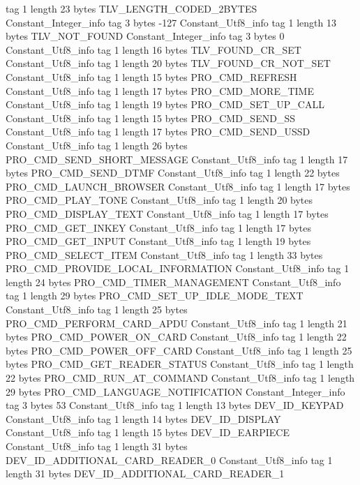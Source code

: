 {{{			tag	1
			length	23
			bytes	TLV_LENGTH_CODED_2BYTES
		}
		Constant_Integer_info {
			tag	3
			bytes	-127
		}
		Constant_Utf8_info {
			tag	1
			length	13
			bytes	TLV_NOT_FOUND
		}
		Constant_Integer_info {
			tag	3
			bytes	0
		}
		Constant_Utf8_info {
			tag	1
			length	16
			bytes	TLV_FOUND_CR_SET
		}
		Constant_Utf8_info {
			tag	1
			length	20
			bytes	TLV_FOUND_CR_NOT_SET
		}
		Constant_Utf8_info {
			tag	1
			length	15
			bytes	PRO_CMD_REFRESH
		}
		Constant_Utf8_info {
			tag	1
			length	17
			bytes	PRO_CMD_MORE_TIME
		}
		Constant_Utf8_info {
			tag	1
			length	19
			bytes	PRO_CMD_SET_UP_CALL
		}
		Constant_Utf8_info {
			tag	1
			length	15
			bytes	PRO_CMD_SEND_SS
		}
		Constant_Utf8_info {
			tag	1
			length	17
			bytes	PRO_CMD_SEND_USSD
		}
		Constant_Utf8_info {
			tag	1
			length	26
			bytes	PRO_CMD_SEND_SHORT_MESSAGE
		}
		Constant_Utf8_info {
			tag	1
			length	17
			bytes	PRO_CMD_SEND_DTMF
		}
		Constant_Utf8_info {
			tag	1
			length	22
			bytes	PRO_CMD_LAUNCH_BROWSER
		}
		Constant_Utf8_info {
			tag	1
			length	17
			bytes	PRO_CMD_PLAY_TONE
		}
		Constant_Utf8_info {
			tag	1
			length	20
			bytes	PRO_CMD_DISPLAY_TEXT
		}
		Constant_Utf8_info {
			tag	1
			length	17
			bytes	PRO_CMD_GET_INKEY
		}
		Constant_Utf8_info {
			tag	1
			length	17
			bytes	PRO_CMD_GET_INPUT
		}
		Constant_Utf8_info {
			tag	1
			length	19
			bytes	PRO_CMD_SELECT_ITEM
		}
		Constant_Utf8_info {
			tag	1
			length	33
			bytes	PRO_CMD_PROVIDE_LOCAL_INFORMATION
		}
		Constant_Utf8_info {
			tag	1
			length	24
			bytes	PRO_CMD_TIMER_MANAGEMENT
		}
		Constant_Utf8_info {
			tag	1
			length	29
			bytes	PRO_CMD_SET_UP_IDLE_MODE_TEXT
		}
		Constant_Utf8_info {
			tag	1
			length	25
			bytes	PRO_CMD_PERFORM_CARD_APDU
		}
		Constant_Utf8_info {
			tag	1
			length	21
			bytes	PRO_CMD_POWER_ON_CARD
		}
		Constant_Utf8_info {
			tag	1
			length	22
			bytes	PRO_CMD_POWER_OFF_CARD
		}
		Constant_Utf8_info {
			tag	1
			length	25
			bytes	PRO_CMD_GET_READER_STATUS
		}
		Constant_Utf8_info {
			tag	1
			length	22
			bytes	PRO_CMD_RUN_AT_COMMAND
		}
		Constant_Utf8_info {
			tag	1
			length	29
			bytes	PRO_CMD_LANGUAGE_NOTIFICATION
		}
		Constant_Integer_info {
			tag	3
			bytes	53
		}
		Constant_Utf8_info {
			tag	1
			length	13
			bytes	DEV_ID_KEYPAD
		}
		Constant_Utf8_info {
			tag	1
			length	14
			bytes	DEV_ID_DISPLAY
		}
		Constant_Utf8_info {
			tag	1
			length	15
			bytes	DEV_ID_EARPIECE
		}
		Constant_Utf8_info {
			tag	1
			length	31
			bytes	DEV_ID_ADDITIONAL_CARD_READER_0
		}
		Constant_Utf8_info {
			tag	1
			length	31
			bytes	DEV_ID_ADDITIONAL_CARD_READER_1
}}}
